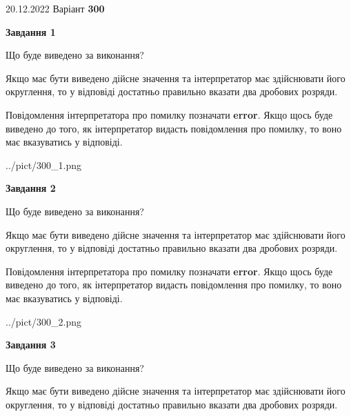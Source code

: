 \documentclass[12pt, ukrainian]{article}
\begin{document}
{20.12.2022 Варіант \No \textbf { 300 }\par}
{
\begin {Large}

{\begin {center}\textbf{Завдання 1}\end {center}}\par
Що буде виведено за виконання? \par

Якщо має бути виведено дійсне значення та інтерпретатор має здійснювати його округлення, 
то у відповіді достатньо правильно вказати два дробових розряди.

Повідомлення інтерпретатора про помилку позначати \textbf{error}.
Якщо щось буде виведено до того, як інтерпретатор видасть повідомлення про помилку, 
то воно має вказуватись у відповіді. \par

\begin{center}
	{../pict/300_1.png}
\end{center}
\newpage

{\begin {center}\textbf{Завдання 2}\end {center}}\par
Що буде виведено за виконання? \par

Якщо має бути виведено дійсне значення та інтерпретатор має здійснювати його округлення, 
то у відповіді достатньо правильно вказати два дробових розряди.

Повідомлення інтерпретатора про помилку позначати \textbf{error}.
Якщо щось буде виведено до того, як інтерпретатор видасть повідомлення про помилку, 
то воно має вказуватись у відповіді. \par

\begin{center}
	{../pict/300_2.png}
\end{center}
\newpage

{\begin {center}\textbf{Завдання 3}\end {center}}\par
Що буде виведено за виконання? \par

Якщо має бути виведено дійсне значення та інтерпретатор має здійснювати його округлення, 
то у відповіді достатньо правильно вказати два дробових розряди.


\end{Large}}
\end{document}
